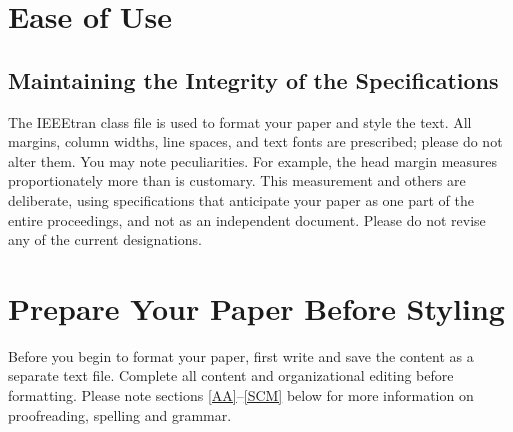 \documentclass[conference]{IEEEtran}
\begin{document}
%


\iffalse
\section{Ease of Use}

\subsection{Maintaining the Integrity of the Specifications}

The IEEEtran class file is used to format your paper and style the text. All margins, 
column widths, line spaces, and text fonts are prescribed; please do not 
alter them. You may note peculiarities. For example, the head margin
measures proportionately more than is customary. This measurement 
and others are deliberate, using specifications that anticipate your paper 
as one part of the entire proceedings, and not as an independent document. 
Please do not revise any of the current designations.

\section{Prepare Your Paper Before Styling}
Before you begin to format your paper, first write and save the content as a 
separate text file. Complete all content and organizational editing before 
formatting. Please note sections \ref{AA}--\ref{SCM} below for more information on 
proofreading, spelling and grammar.
\end{document}

